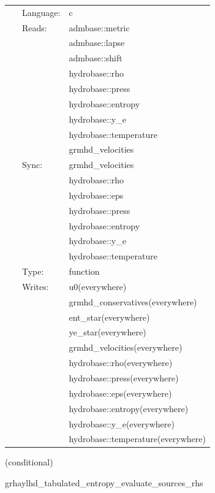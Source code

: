  \begin{tabular*}{160mm}{cll} 
~ & Language:  & c \\ 
~ & Reads:  & admbase::metric \\ 
~& ~ &admbase::lapse\\ 
~& ~ &admbase::shift\\ 
~& ~ &hydrobase::rho\\ 
~& ~ &hydrobase::press\\ 
~& ~ &hydrobase::entropy\\ 
~& ~ &hydrobase::y\_e\\ 
~& ~ &hydrobase::temperature\\ 
~& ~ &grmhd\_velocities\\ 
~ & Sync:  & grmhd\_velocities \\ 
~& ~ &hydrobase::rho\\ 
~& ~ &hydrobase::eps\\ 
~& ~ &hydrobase::press\\ 
~& ~ &hydrobase::entropy\\ 
~& ~ &hydrobase::y\_e\\ 
~& ~ &hydrobase::temperature\\ 
~ & Type:  & function \\ 
~ & Writes:  & u0(everywhere) \\ 
~& ~ &grmhd\_conservatives(everywhere)\\ 
~& ~ &ent\_star(everywhere)\\ 
~& ~ &ye\_star(everywhere)\\ 
~& ~ &grmhd\_velocities(everywhere)\\ 
~& ~ &hydrobase::rho(everywhere)\\ 
~& ~ &hydrobase::press(everywhere)\\ 
~& ~ &hydrobase::eps(everywhere)\\ 
~& ~ &hydrobase::entropy(everywhere)\\ 
~& ~ &hydrobase::y\_e(everywhere)\\ 
~& ~ &hydrobase::temperature(everywhere)\\ 
\end{tabular*} 


\vspace{5mm}

   (conditional) 

\hspace{5mm} grhaylhd\_tabulated\_entropy\_evaluate\_sources\_rhs 

\hspace{5mm}{\it entropy+tabulated version of grhaylhd\_evaluate\_sources\_rhs } 


